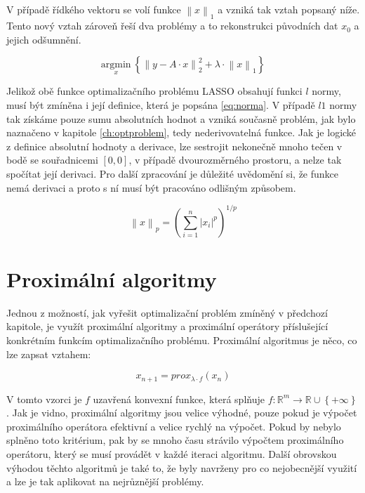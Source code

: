 \documentclass[FM,BP]{tulthesis}
\newcounter{Vzorce}
\begin{document}
V případě řídkého vektoru se volí funkce $\left\|x\right\|_1$ a vzniká tak vztah popsaný níže. Tento nový vztah zároveň řeší dva problémy a to rekonstrukci původních dat $x_0$ a jejich odšumnění.

\begin{equation} \label{eq:Konkretni LASSO} \tag{Vzorec \theVzorce}
\underset{x} {\mathrm{argmin}} ~\left\{\left\|y-A \cdot x\right\| ^2 _2+ \lambda \cdot \left\|x\right\|_1\right\}
\end{equation}

Jelikož obě funkce optimalizačního problému LASSO obsahují funkci $l$ normy, musí být zmíněna i její definice, která je popsána \ref{eq:norma}. V případě $l1$ normy tak získáme pouze sumu absolutních hodnot a vzniká současně problém, jak bylo naznačeno v kapitole \ref{ch:optproblem}, tedy nederivovatelná funkce. Jak je logické z definice absolutní hodnoty a derivace, lze sestrojit nekonečně mnoho tečen v bodě se souřadnicemi $[0, 0]$, v případě dvourozměrného prostoru, a nelze tak spočítat její derivaci. Pro další zpracování je důležité uvědomění si, že funkce nemá derivaci a proto s ní musí být pracováno odlišným způsobem.

\begin{equation} \label{eq:norma} \tag{Vzorec \theVzorce}
\left\|x\right\|_p = \left(\sum_{i=1}^{n} \left|x_i\right|^p\right)^{1/p}
\end{equation}

\chapter{Proximální algoritmy}
\label{ch:proxalg}
Jednou z možností, jak vyřešit optimalizační problém zmíněný v předchozí kapitole, je využít proximální algoritmy a proximální operátory příslušející konkrétním funkcím optimalizačního problému. Proximální algoritmus je něco, co lze zapsat vztahem:

\begin{equation} \label{eq:proxAlg} \tag{Vzorec \theVzorce}
x_{n+1} = prox_{\lambda \cdot f}(x_{n})
\end{equation}

V tomto vzorci je $f$ uzavřená konvexní funkce, která splňuje $f : \mathbb{R}^{m} \rightarrow \mathbb{R} \cup \left\{+\infty\right\}$. Jak je vidno, proximální algoritmy jsou velice výhodné, pouze pokud je výpočet proximálního operátora efektivní a velice rychlý na výpočet. Pokud by nebylo splněno toto kritérium, pak by se mnoho času strávilo výpočtem proximálního operátoru, který se musí provádět v každé iteraci algoritmu. Další obrovskou výhodou těchto algoritmů je také to, že byly navrženy pro co nejobecnější využití a lze je tak aplikovat na nejrůznější problémy.
\end{document}
